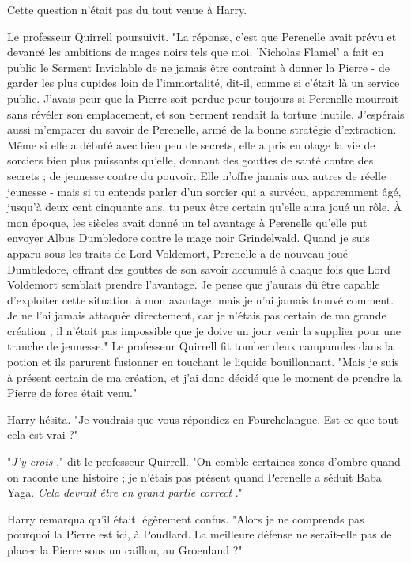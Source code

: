 Cette question n'était pas du tout venue à Harry.

Le professeur Quirrell poursuivit. "La réponse, c'est que Perenelle avait prévu et devancé les ambitions de mages noirs tels que moi. 'Nicholas Flamel' a fait en public le Serment Inviolable de ne jamais être contraint à donner la Pierre - de garder les plus cupides loin de l'immortalité, dit-il, comme si c'était là un service public. J'avais peur que la Pierre soit perdue pour toujours si Perenelle mourrait sans révéler son emplacement, et son Serment rendait la torture inutile. J'espérais aussi m'emparer du savoir de Perenelle, armé de la bonne stratégie d'extraction. Même si elle a débuté avec bien peu de secrets, elle a pris en otage la vie de sorciers bien plus puissants qu'elle, donnant des gouttes de santé contre des secrets ; de jeunesse contre du pouvoir. Elle n'offre jamais aux autres de réelle jeunesse - mais si tu entends parler d'un sorcier qui a survécu, apparemment âgé, jusqu'à deux cent cinquante ans, tu peux être certain qu'elle aura joué un rôle. À mon époque, les siècles avait donné un tel avantage à Perenelle qu'elle put envoyer Albus Dumbledore contre le mage noir Grindelwald. Quand je suis apparu sous les traits de Lord Voldemort, Perenelle a de nouveau joué Dumbledore, offrant des gouttes de son savoir accumulé à chaque fois que Lord Voldemort semblait prendre l'avantage. Je pense que j'aurais dû être capable d'exploiter cette situation à mon avantage, mais je n'ai jamais trouvé comment. Je ne l'ai jamais attaquée directement, car je n'étais pas certain de ma grande création ; il n'était pas impossible que je doive un jour venir la supplier pour une tranche de jeunesse." Le professeur Quirrell fit tomber deux campanules dans la potion et ils parurent fusionner en touchant le liquide bouillonnant. "Mais je suis à présent certain de ma création, et j'ai donc décidé que le moment de prendre la Pierre de force était venu."

Harry hésita. "Je voudrais que vous répondiez en Fourchelangue. Est-ce que tout cela est vrai ?"

"\emph{J'y crois} ," dit le professeur Quirrell. "On comble certaines zones d'ombre quand on raconte une histoire ; je n'étais pas présent quand Perenelle a séduit Baba Yaga. \emph{Cela devrait être en grand partie correct} ."

Harry remarqua qu'il était légèrement confus. "Alors je ne comprends pas pourquoi la Pierre est ici, à Poudlard. La meilleure défense ne serait-elle pas de placer la Pierre sous un caillou, au Groenland ?"

